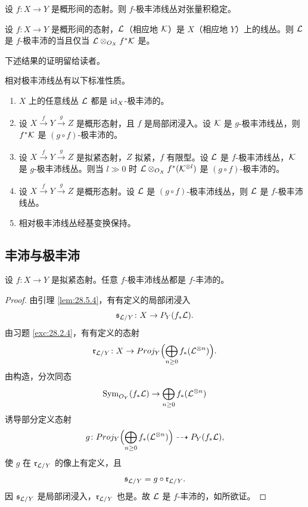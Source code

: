 \begin{corollary}\label{cor:28.5.9}
设 $f\colon X\to Y$ 是概形间的态射。则 $f$-极丰沛线丛对张量积稳定。
\end{corollary}

\begin{corollary}\label{cor:28.5.10}
设 $f\colon X\to Y$ 是概形间的态射，$\mathcal{L}$（相应地 $\mathcal{K}$）是 $X$（相应地 $Y$）上的线丛。则 $\mathcal{L}$ 是 $f$-极丰沛的当且仅当 $\mathcal{L}\otimes_{O_X}f^*\mathcal{K}$ 是。
\end{corollary}

下述结果的证明留给读者。

\begin{lemma}\label{lem:28.5.11}
相对极丰沛线丛有以下标准性质。
\begin{enumerate}[label=(\arabic*),leftmargin=2.6em,itemsep=0.35ex]
  \item $X$ 上的任意线丛 $\mathcal{L}$ 都是 $\operatorname{id}_X$-极丰沛的。
  \item 设 $X\xrightarrow{f}Y\xrightarrow{g}Z$ 是概形态射，且 $f$ 是局部闭浸入。设 $\mathcal{K}$ 是 $g$-极丰沛线丛，则 $f^*\mathcal{K}$ 是 $(g\circ f)$-极丰沛的。
  \item[\textup{(2')}] 设 $X\xrightarrow{f}Y\xrightarrow{g}Z$ 是拟紧态射，$Z$ 拟紧，$f$ 有限型。设 $\mathcal{L}$ 是 $f$-极丰沛线丛，$\mathcal{K}$ 是 $g$-极丰沛线丛。则当 $l\gg 0$ 时 $\mathcal{L}\otimes_{O_X}f^*(\mathcal{K}^{\otimes l})$ 是 $(g\circ f)$-极丰沛的。
  \item 设 $X\xrightarrow{f}Y\xrightarrow{g}Z$ 是概形态射。设 $\mathcal{L}$ 是 $(g\circ f)$-极丰沛线丛，则 $\mathcal{L}$ 是 $f$-极丰沛线丛。
  \item 相对极丰沛线丛经基变换保持。
\end{enumerate}
\end{lemma}

\subsection{丰沛与极丰沛}\label{sec:28.6}

\begin{lemma}\label{lem:28.6.1}
设 $f\colon X\to Y$ 是拟紧态射。任意 $f$-极丰沛线丛都是 $f$-丰沛的。
\end{lemma}

\begin{proof}
由引理 \ref{lem:28.5.4}，有有定义的局部闭浸入
\[
\mathfrak s_{\mathcal{L}/Y}\colon X\to P_Y(f_*\mathcal{L}).
\]
由习题 \ref{exc:28.2.4}，有有定义的态射
\[
\mathfrak r_{\mathcal{L}/Y}\colon X\to Proj_Y\Bigl(\bigoplus_{n\ge 0}f_*(\mathcal{L}^{\otimes n})\Bigr).
\]
由构造，分次同态
\[
\operatorname{Sym}_{O_Y}(f_*\mathcal{L})\to\bigoplus_{n\ge 0}f_*(\mathcal{L}^{\otimes n})
\]
诱导部分定义态射
\[
g\colon Proj_Y\Bigl(\bigoplus_{n\ge 0}f_*(\mathcal{L}^{\otimes n})\Bigr)\dashrightarrow P_Y(f_*\mathcal{L}),
\]
使 $g$ 在 $\mathfrak r_{\mathcal{L}/Y}$ 的像上有定义，且
\[
\mathfrak s_{\mathcal{L}/Y}=g\circ\mathfrak r_{\mathcal{L}/Y}.
\]
因 $\mathfrak s_{\mathcal{L}/Y}$ 是局部闭浸入，$\mathfrak r_{\mathcal{L}/Y}$ 也是。故 $\mathcal{L}$ 是 $f$-丰沛的，如所欲证。
\end{proof}

